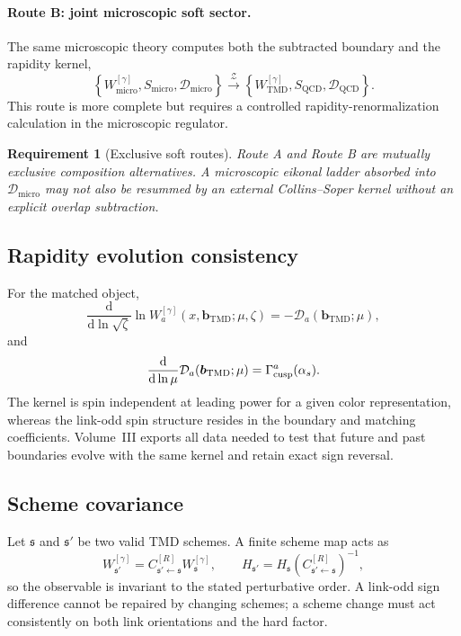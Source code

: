 \documentclass[11pt]{article}
\newtheorem{requirement}[definition]{Requirement}
\newcommand{\bM}{\bm{b}_{\mathrm{TMD}}}
\newcommand{\dd}{\mathrm{d}}
\newcommand{\TMD}{\mathrm{TMD}}
\newcommand{\QCD}{\mathrm{QCD}}
\newcommand{\cZ}{\mathcal Z}
\newcommand{\cD}{\mathcal D}
\newcommand{\micro}{\mathrm{micro}}
\begin{document}
\paragraph{Route B: joint microscopic soft sector.}
The same microscopic theory computes both the subtracted boundary and the
rapidity kernel,
\begin{equation}
 \left\{W_{\micro}^{[\gamma]},S_{\micro},\cD_{\micro}\right\}
 \xrightarrow{\cZ}
 \left\{W_{\TMD}^{[\gamma]},S_{\QCD},\cD_{\QCD}\right\}.
\label{eq:joint-soft-route}
\end{equation}
This route is more complete but requires a controlled rapidity-renormalization
calculation in the microscopic regulator.

\begin{requirement}[Exclusive soft routes]
\label{req:exclusive-soft-routes}
Route A and Route B are mutually exclusive composition alternatives.  A
microscopic eikonal ladder absorbed into \(\cD_{\micro}\) may not also be
resummed by an external Collins--Soper kernel without an explicit overlap
subtraction.
\end{requirement}

\subsection{Rapidity evolution consistency}

For the matched object,
\begin{equation}
 \frac{\dd}{\dd\ln\sqrt\zeta}
 \ln W_{a}^{[\gamma]}(x,\bM;\mu,\zeta)
 =-\cD_a(\bM;\mu),
\label{eq:cs-evolution-volume3}
\end{equation}
and
\begin{equation}
 \frac{\dd}{\dd\ln\mu}\cD_a(\bM;\mu)
 =\Gamma_{\rm cusp}^a(\alpha_s).
\label{eq:cs-integrability-volume3}
\end{equation}
The kernel is spin independent at leading power for a given color
representation, whereas the link-odd spin structure resides in the boundary
and matching coefficients.  Volume~III exports all data needed to test that
future and past boundaries evolve with the same kernel and retain exact sign
reversal.

\subsection{Scheme covariance}

Let \(\mathfrak s\) and \(\mathfrak s'\) be two valid TMD schemes.  A finite
scheme map acts as
\begin{equation}
 W^{[\gamma]}_{\mathfrak s'}
 =C_{\mathfrak s'\leftarrow\mathfrak s}^{[R]}
 W^{[\gamma]}_{\mathfrak s},
 \qquad
 H_{\mathfrak s'}
 =H_{\mathfrak s}
 \left(C_{\mathfrak s'\leftarrow\mathfrak s}^{[R]}\right)^{-1},
\label{eq:scheme-covariance}
\end{equation}
so the observable is invariant to the stated perturbative order.  A
link-odd sign difference cannot be repaired by changing schemes; a scheme
change must act consistently on both link orientations and the hard factor.
\end{document}
